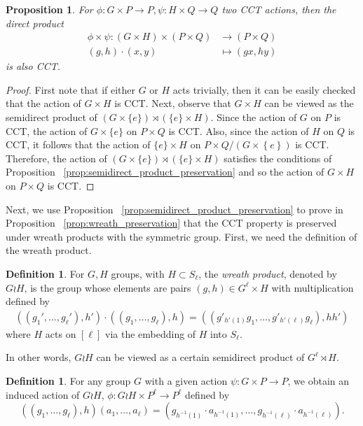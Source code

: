 \documentclass[smallextended, envcountsame, numbook]{svjour3}
\theoremstyle{plain}
\newtheorem{prop}[thm]{Proposition}
\theoremstyle{definition}
\newtheorem{defn}[thm]{Definition}
\theoremstyle{remark}
\numberwithin{equation}{section}
\begin{document}
\begin{prop}
\label{prop:direct_product_preservation}
For $\phi\colon G\times P\rightarrow P,\psi\colon H \times Q \rightarrow Q$ two CCT actions, then the direct product 
\begin{align*}	
\phi \times \psi\colon(G\times H)\times (P\times Q) &\rightarrow (P\times Q) \\
(g,h)\cdot (x,y) &\mapsto (gx,hy)
\end{align*}
is also CCT.
\end{prop}

\begin{proof}
First note that if either $G$ or $H$ acts trivially, then it can be easily checked that the action of $G\times H$ is CCT.  Next, observe that $G \times H$ can be viewed as the semidirect product of $(G\times \{e\}) \rtimes (\{e\} \times H)$. Since the action of $G$ on $P$ is CCT, the action of $G\times \{e\}$ on $P \times Q$ is CCT. Also, since the action of $H$ on $Q$ is CCT, it follows that the action of $\{e\}\times H$ on $P \times Q/(G \times \left\{ e \right\})$ is CCT. Therefore, the action of $(G\times \{e\}) \rtimes (\{e\} \times H)$ satisfies the conditions of Proposition ~\ref{prop:semidirect_product_preservation} and so the action of $G\times H$ on $P \times Q$ is CCT.
\end{proof}

Next, we use Proposition ~\ref{prop:semidirect_product_preservation} to prove in Proposition ~\ref{prop:wreath_preservation} that the CCT property is preserved under wreath products with the symmetric group. First, we need the definition of the wreath product.

\begin{defn}
For $G, H$ groups, with $H \subset S_\ell$, the {\it wreath product}, denoted by $G \wr H$, is the group whose elements are pairs $(g,h) \in G^\ell\times H$ with multiplication defined by
\begin{align*}
((g_1',\ldots, g_\ell'),h') \cdot ((g_1,\ldots, g_\ell) ,h) =((g'_{h'(1)}g_1,\ldots, g'_{h'(\ell)}g_\ell),hh')
\end{align*}
where $H$ acts on $[\ell]$ via the embedding of $H$ into $S_\ell$.
\end{defn}

In other words, $G\wr H$ can be viewed as a certain semidirect product of $G^\ell \rtimes H$.

\begin{defn}
\label{defn:wreath_action}
For any group $G$ with a given action $\psi\colon G\times P \rightarrow P$, we obtain an induced action of $G \wr H$, $\phi\colon G \wr H \times P^\ell \rightarrow P^\ell$ defined by 
$$((g_1,\ldots, g_\ell),h)(a_1,\ldots, a_\ell) = (g_{h^{-1}(1)}\cdot a_{h^{-1}(1)},\ldots,g_{h^{-1}(\ell)} \cdot a_{h^{-1}(\ell)}).$$
\end{defn}
\end{document}
